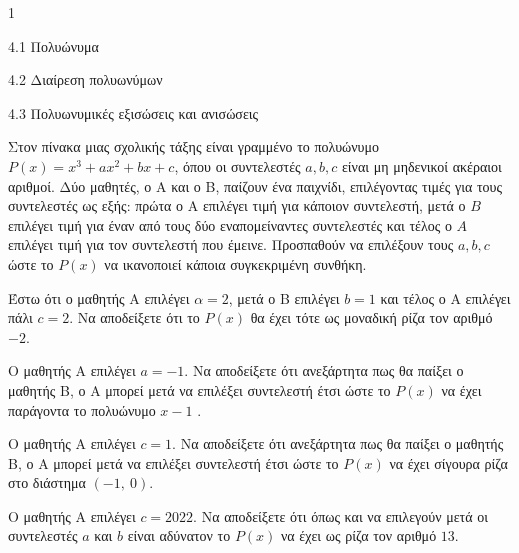 \begin{ylh}{1}
\item 4.1 Πολυώνυμα
\item 4.2 Διαίρεση πολυωνύμων
\item 4.3 Πολυωνυμικές εξισώσεις και ανισώσεις
\end{ylh}
Στον πίνακα μιας σχολικής τάξης είναι γραμμένο το πολυώνυμο $P(x) = x^{3} + ax^{2} + bx + c$, όπου οι συντελεστές $a,b,c$ είναι μη μηδενικοί ακέραιοι αριθμοί. Δύο μαθητές, ο Α και ο Β, παίζουν ένα παιχνίδι, επιλέγοντας τιμές για τους συντελεστές ως εξής: πρώτα ο Α επιλέγει τιμή για κάποιον συντελεστή, μετά ο $Β$ επιλέγει τιμή για έναν από τους δύο εναπομείναντες συντελεστές και τέλος ο $Α$ επιλέγει τιμή για τον συντελεστή που έμεινε. Προσπαθούν να επιλέξουν τους $a,b,c$ ώστε το $P(x)$ να ικανοποιεί κάποια συγκεκριμένη συνθήκη.
\begin{alist}
\item Έστω ότι ο μαθητής Α επιλέγει $\alpha = 2$, μετά ο Β επιλέγει $b = 1$ και τέλος ο Α επιλέγει πάλι $c = 2$. Να αποδείξετε ότι το $P(x)$ θα έχει τότε ως μοναδική ρίζα τον αριθμό $- 2$.
\item Ο μαθητής Α επιλέγει $a = - 1$. Να αποδείξετε ότι ανεξάρτητα πως θα παίξει ο μαθητής Β, ο Α μπορεί μετά να επιλέξει συντελεστή έτσι ώστε το $P(x)$ να έχει παράγοντα το πολυώνυμο $x - 1$ .
\item Ο μαθητής Α επιλέγει $c = 1$. Να αποδείξετε ότι ανεξάρτητα πως θα παίξει ο μαθητής Β, ο Α μπορεί μετά να επιλέξει συντελεστή έτσι ώστε το $P(x)$ να έχει σίγουρα ρίζα στο διάστημα $( - 1,\ 0)$.
\item Ο μαθητής Α επιλέγει $c = 2022$. Να αποδείξετε ότι όπως και να επιλεγούν μετά οι συντελεστές $a$ και $b$ είναι αδύνατον το $P(x)$ να έχει ως ρίζα τον αριθμό $13$.
\end{alist}

